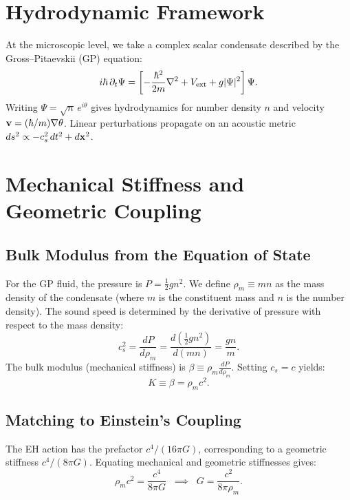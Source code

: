 \documentclass[11pt,a4paper]{article}
\begin{document}
\section{Hydrodynamic Framework}
At the microscopic level, we take a complex scalar condensate described by the Gross--Pitaevskii (GP) equation:\cite{Gross1961,Pitaevskii1961}
\begin{equation}
i\hbar\,\partial_t\Psi=\left[-\frac{\hbar^2}{2m}\nabla^2 + V_{\rm ext} + g|\Psi|^2\right]\Psi.
\end{equation}
Writing $\Psi=\sqrt{n}\,e^{i\theta}$ gives hydrodynamics for number density $n$ and velocity $\vb{v}=(\hbar/m)\nabla\theta$. Linear perturbations propagate on an acoustic metric $ds^2\propto -c_s^2\,dt^2 + d\vb{x}^2$.

\section{Mechanical Stiffness and Geometric Coupling}

\subsection{Bulk Modulus from the Equation of State}
For the GP fluid, the pressure is $P=\tfrac12 g n^2$. We define $\rho_m \equiv mn$ as the mass density of the condensate (where $m$ is the constituent mass and $n$ is the number density). The sound speed is determined by the derivative of pressure with respect to the mass density:\cite{LandauLifshitz}
\begin{equation}
c_s^2 = \frac{dP}{d\rho_m} = \frac{d(\tfrac{1}{2}gn^2)}{d(mn)} = \frac{gn}{m}.
\end{equation}
The bulk modulus (mechanical stiffness) is $\beta \equiv \rho_m \frac{dP}{d\rho_m}$. Setting $c_s=c$ yields:
\begin{equation}
K \equiv \beta = \rho_m c^2.
\end{equation}

\subsection{Matching to Einstein’s Coupling}

The EH action has the prefactor $c^4/(16\pi G)$, corresponding to a geometric stiffness $c^4/(8\pi G)$. 
Equating mechanical and geometric stiffnesses gives:
\begin{equation}
\label{eq:Gfromrho}
\rho_m c^2 = \frac{c^4}{8\pi G}
\;\;\implies\;\;
G = \frac{c^2}{8\pi \rho_m}.
\end{equation}
\end{document}

